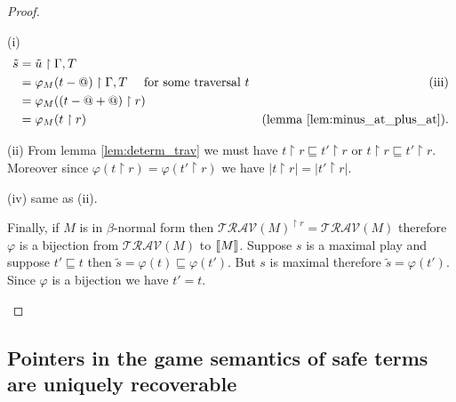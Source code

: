 \begin{proof}
\begin{itemize}
(i)
\begin{align*}
\tilde{s} &= \tilde{u} \upharpoonright \Gamma, T \\
&= \varphi_M(t-@) \upharpoonright \Gamma, T  \quad \mbox{ for some traversal $t$}      & \mbox{(iii)}\\
&= \varphi_M((t-@+@)\upharpoonright r) \\
&= \varphi_M(t\upharpoonright r)                   & \mbox{(lemma \ref{lem:minus_at_plus_at}).}
\end{align*}

(ii) From lemma \ref{lem:determ_trav} we must have $t
\upharpoonright r \sqsubseteq t'\upharpoonright r$ or $t
\upharpoonright r \sqsubseteq t'\upharpoonright r$. Moreover since
$\varphi(t \upharpoonright r) = \varphi(t' \upharpoonright r)$ we
have $|t \upharpoonright r|=|t' \upharpoonright r|$.

(iv) same as (ii).

\vspace{12pt}

Finally, if $M$ is in $\beta$-normal form then
$\mathcal{TRAV}(M)^{\upharpoonright r} = \mathcal{TRAV}(M)$
therefore $\varphi$ is a bijection from $\mathcal{TRAV}(M)$ to
${[\![ M ]\!]}$. Suppose $s$ is a maximal play and suppose $t' \sqsubseteq
t$ then $\tilde{s} = \varphi(t) \sqsubseteq \varphi(t')$. But $s$ is
maximal therefore $\tilde{s} = \varphi(t')$. Since $\varphi$ is a
bijection we have $t'=t$.

\end{itemize}
\end{proof}

%




\subsection{Pointers in the game semantics of safe terms are uniquely recoverable}


